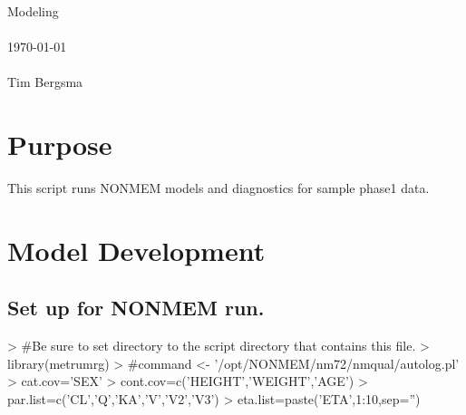 
\usepackage{Sweave}

 

\vspace*{2cm}
\begin{center}
{\Large Modeling}\\
~\\
\today\\
~\\
Tim Bergsma\\
\end{center}
\newpage

\section{Purpose}
This script runs NONMEM models and diagnostics for sample phase1 data.
\section{Model Development}
\subsection{Set up for NONMEM run.}
\begin{Schunk}
\begin{Sinput}
> #Be sure to set directory to the script directory that contains this file.
> library(metrumrg)
> #command <- '/opt/NONMEM/nm72/nmqual/autolog.pl'
> cat.cov='SEX'
> cont.cov=c('HEIGHT','WEIGHT','AGE')
> par.list=c('CL','Q','KA','V','V2','V3')
> eta.list=paste('ETA',1:10,sep='')
\end{Sinput}
\end{Schunk}
